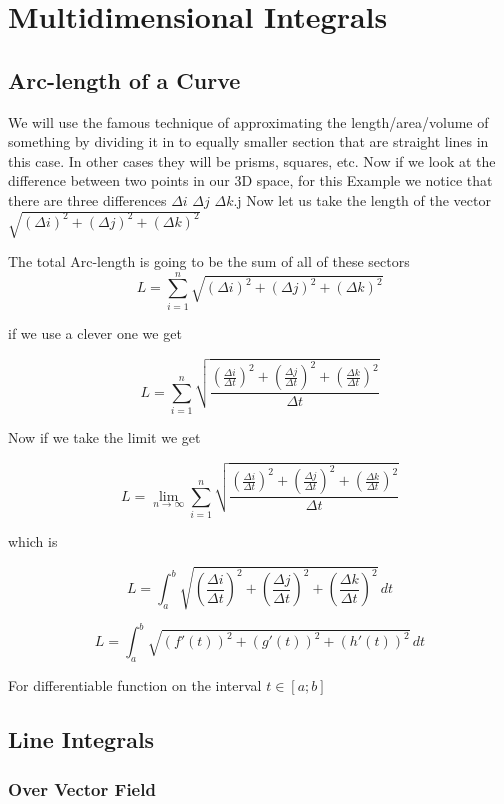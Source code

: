 \newpage
\section{Multidimensional Integrals}

\subsection{Arc-length of a Curve}

We will use the famous technique of approximating the length/area/volume of something
by dividing it in to equally smaller section that are straight lines in this case. In other cases 
they will be prisms, squares, etc. Now if we look at the difference between two points in our 3D space, 
for this Example
we notice that there are three differences \(\Delta i\) \(\Delta j\) \(\Delta k\).j
Now let us take the length of the vector \(\sqrt{{(\Delta i)}^2 + {(\Delta j)}^2 + {(\Delta k)}^2}\)

The total Arc-length is going to be the sum of all of these sectors
\[
L =  \sum_{i = 1}^{n}\sqrt{{(\Delta i)}^2 + {(\Delta j)}^2 + {(\Delta k)}^2}
\]

if we use a clever one we get

\[
L =  \sum_{i = 1}^{n}\sqrt{\frac{{\left(\frac{\Delta i}{\Delta t}\right)}^2 + {\left(\frac{\Delta j}{\Delta t}\right)}^2 + {\left(\frac{\Delta k}{\Delta t}\right)}^2}{\Delta t}}
\]

Now if we take the limit we get

\[
L =  \lim_{n\to \infty}\sum_{i = 1}^{n}\sqrt{\frac{{\left(\frac{\Delta i}{\Delta t}\right)}^2 + {\left(\frac{\Delta j}{\Delta t}\right)}^2 + {\left(\frac{\Delta k}{\Delta t}\right)}^2}{\Delta t}}
\]

which is 

\[
L =  \int_{a}^{b}\sqrt{{\left(\frac{\Delta i}{\Delta t}\right)}^2 + {\left(\frac{\Delta j}{\Delta t}\right)}^2 + {\left(\frac{\Delta k}{\Delta t}\right)}^2}\,dt
\]

\[
L =  \int_{a}^{b}\sqrt{{(f'(t))}^2 + {(g'(t))}^2 + {(h'(t))}^2}\,dt
\]

For differentiable function on the interval \(t \in [a; b]\)

\subsection{Line Integrals}

\subsubsection{Over Vector Field}

